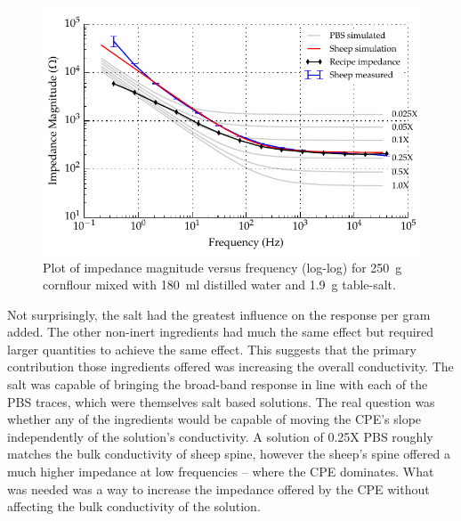   \begin{figure}
    \centering
    \includegraphics[width=\textwidth]{content/pt2/graphics/run14_180ml-distilledWater_250g-cornflour_1g9-salt_ZVsF_graph_mag}
    \caption{\label{fig:recipe_cornflour_salt_extraWater_mag}Plot of impedance magnitude versus frequency (log-log) for \SI{250}{\gram} cornflour mixed with \SI{180}{\milli\litre} distilled water and \SI{1.9}{\gram} table-salt.}
  \end{figure}

  Not surprisingly, the salt had the greatest influence on the response per gram added.
  The other non-inert ingredients had much the same effect but required larger quantities to achieve the same effect.
  This suggests that the primary contribution those ingredients offered was increasing the overall conductivity.
  The salt was capable of bringing the broad-band response in line with each of the PBS traces, which were themselves salt based solutions.
  The real question was whether any of the ingredients would be capable of moving the CPE's slope independently of the solution's conductivity.
  A solution of 0.25X PBS roughly matches the bulk conductivity of sheep spine, however the sheep's spine offered a much higher impedance at low frequencies -- where the CPE dominates.
  What was needed was a way to increase the impedance offered by the CPE without affecting the bulk conductivity of the solution.

